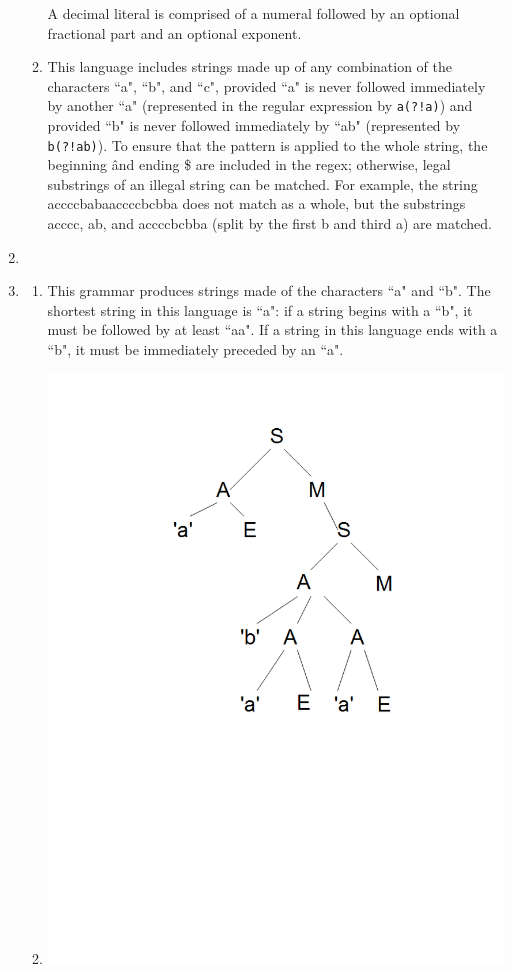 \documentclass[landscape]{report}
\begin{document}
\begin{enumerate}
\begin{enumerate}
        A decimal literal is comprised of a numeral followed by an optional
        fractional part and an optional exponent.
      \item %
        
        This language includes strings made up of any combination of the
        characters ``a", ``b", and ``c", provided ``a" is never followed
        immediately by another ``a" (represented in the regular expression by
        \lstinline`a(?!a)`) and provided ``b" is never followed immediately by
        ``ab" (represented by \lstinline`b(?!ab)`). To ensure that the pattern
        is applied to the whole string, the beginning \^ and ending \$ are
        included in the regex; otherwise, legal substrings of an illegal string
        can be matched. For example, the string accccbabaaccccbcbba does not
        match as a whole, but the substrings acccc, ab, and accccbcbba (split
        by the first b and third a) are matched.
    \end{enumerate}
    \item %
      
    \item %
    \begin{enumerate}
      \item %
        This grammar produces strings made of the characters ``a" and ``b".
        The shortest string in this language is ``a": if a string begins with a
        ``b", it must be followed by at least ``aa". If a string in this
        language ends with a ``b", it must be immediately preceded by an ``a".
      \item %
        \includegraphics{img/prob3b.png}

\end{enumerate}
\end{enumerate}
\end{document}

